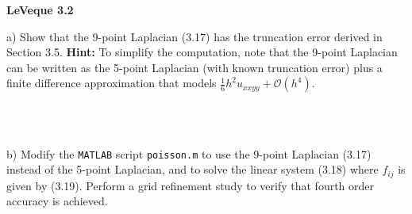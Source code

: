 \textbf{LeVeque 3.2} 

a) Show that the 9-point Laplacian (3.17) has the truncation error derived in Section 3.5. \textbf{Hint: } To simplify
   the computation, note that the 9-point Laplacian can be written as the 5-point Laplacian (with known truncation 
   error) plus a finite difference approximation that models $\frac{1}{6} h^2 u_{xxyy} + \mathcal{O}(h^4)$.

\begin{solution}\ \\\\
\end{solution}

\pagebreak
b) Modify the \texttt{MATLAB} script \texttt{poisson.m} to use the 9-point Laplacian (3.17) instead of the 5-point
   Laplacian, and to solve the linear system (3.18) where $f_{ij}$ is given by (3.19). Perform a grid refinement study
   to verify that fourth order accuracy is achieved.

\begin{solution}\ \\\\
\end{solution}